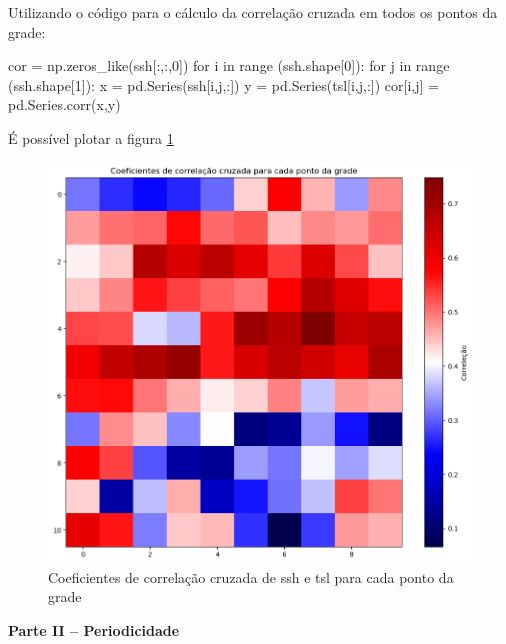 \documentclass[12pt,a4paper,portuguese]{article}
\begin{document}
	Utilizando o código para o cálculo da correlação cruzada em todos os pontos da grade:
	\begin{python}
cor = np.zeros_like(ssh[:,:,0])
for i in range (ssh.shape[0]):
for j in range (ssh.shape[1]):
x = pd.Series(ssh[i,j,:])
y = pd.Series(tsl[i,j,:])
cor[i,j] = pd.Series.corr(x,y)
	\end{python}
	É possível plotar a figura \ref{fig:lista3-3c}
	
\begin{figure}[H]
	\centering
	\includegraphics[width=1\linewidth]{lista3-3c}
	\caption{Coeficientes de correlação cruzada de ssh e tsl para cada ponto da grade}
	\label{fig:lista3-3c}
\end{figure}
	
\textbf{Parte II – Periodicidade}
	
\end{document}

